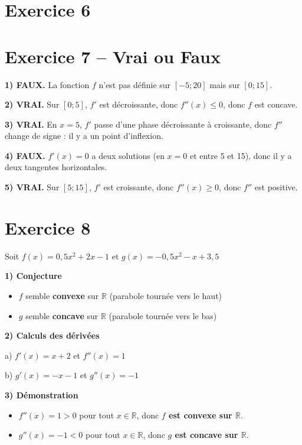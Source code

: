 \documentclass[11pt,a4paper]{article}  %
\begin{document}
\section*{Exercice 6}



\section*{Exercice 7 -- Vrai ou Faux}

\textbf{1) FAUX.} La fonction $f$ n'est pas définie sur $[-5; 20]$ mais sur $[0; 15]$.

\textbf{2) VRAI.} Sur $[0; 5]$, $f'$ est décroissante, donc $f''(x) \leq 0$, donc $f$ est concave.

\textbf{3) VRAI.} En $x = 5$, $f'$ passe d'une phase décroissante à croissante, donc $f''$ change de signe : il y a un point d'inflexion.

\textbf{4) FAUX.} $f'(x) = 0$ a deux solutions (en $x = 0$ et entre 5 et 15), donc il y a deux tangentes horizontales.

\textbf{5) VRAI.} Sur $[5; 15]$, $f'$ est croissante, donc $f''(x) \geq 0$, donc $f''$ est positive.

\section*{Exercice 8}

Soit $f(x) = 0,5x^2 + 2x - 1$ et $g(x) = -0,5x^2 - x + 3,5$

\textbf{1) Conjecture}

\begin{itemize}
	\item $f$ semble \textbf{convexe} sur $\mathbb{R}$ (parabole tournée vers le haut)
	\item $g$ semble \textbf{concave} sur $\mathbb{R}$ (parabole tournée vers le bas)
\end{itemize}

\textbf{2) Calculs des dérivées}

a) $f'(x) = x + 2$ \quad et \quad $f''(x) = 1$

b) $g'(x) = -x - 1$ \quad et \quad $g''(x) = -1$

\textbf{3) Démonstration}

\begin{itemize}
	\item $f''(x) = 1 > 0$ pour tout $x \in \mathbb{R}$, donc \textbf{$f$ est convexe sur $\mathbb{R}$}.
	\item $g''(x) = -1 < 0$ pour tout $x \in \mathbb{R}$, donc \textbf{$g$ est concave sur $\mathbb{R}$}.
\end{itemize}
\end{document}
